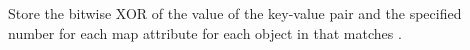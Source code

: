 Store the bitwise XOR of the value of the key-value pair and the specified
number for each map attribute for each object in  that matches
.


